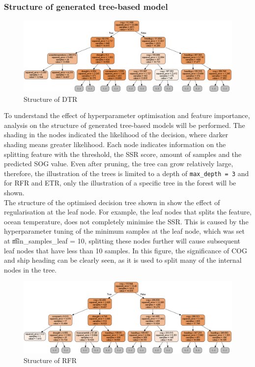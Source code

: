 \subsubsection*{Structure of generated tree-based model}

\begin{figure}[h]
    \centering
        \includegraphics[width=.9\textwidth]{02_figures/dtr_mod_1tree.png}
        \caption{Structure of DTR}
        \label{fig:dtr_tree_hpov}
\end{figure}

To understand the effect of hyperparameter optimisation and feature importance, analysis on the structure of generated tree-based models will be performed. The shading in the nodes indicated the likelihood of the decision, where darker shading means greater likelihood. Each node indicates information on the splitting feature with the threshold, the SSR score, amount of samples and the predicted SOG value. Even after pruning, the tree can grow relatively large, therefore, the illustration of the trees is limited to a depth of {\tt max\_depth = 3} and for RFR and ETR, only the illustration of a specific tree in the forest will be shown.\\

The structure of the optimised decision tree shown in  show the effect of regularisation at the leaf node. For example, the leaf nodes that splits the feature, ocean temperature, does not completely minimise the SSR. This is caused by the hyperparameter tuning of the minimum samples at the leaf node, which was set at {\t min\_samples\_leaf = 10}, splitting these nodes further will cause subsequent leaf nodes that have less than 10 samples. In this figure, the significance of COG and ship heading can be clearly seen, as it is used to split many of the internal nodes in the tree.\\

\begin{figure}[h]
    \centering
        \includegraphics[width=.9\textwidth]{02_figures/rfr_mod_it1.png}
        \caption{Structure of RFR}
        \label{fig:rfr_tree1_hpov}
\end{figure}


